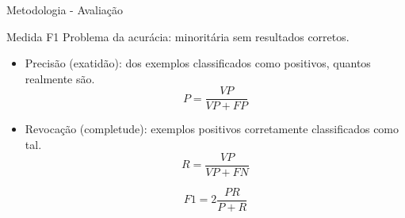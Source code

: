 \documentclass{beamer}
\begin{document}
\begin{frame}{Metodologia - Avaliação}
\setlength\leftmargini{1em}
\begin{block}{Medida F1}
\justifying
Problema da acurácia: minoritária sem resultados corretos. \\
\begin{itemize}

\item Precisão (exatidão): dos exemplos classificados como positivos, quantos realmente são.
\vspace{-1.5em}
\begin{equation*}
  P = \frac{VP}{VP + FP}
\end{equation*}
\item Revocação (completude): exemplos positivos corretamente classificados como tal. 
\begin{equation*}
  R = \frac{VP}{VP + FN}
\end{equation*}

\pause
\begin{equation*}
  F1 = 2 \frac{PR}{P+R}
\end{equation*}
\end{itemize}
\end{block}
\end{frame}
\end{document}
